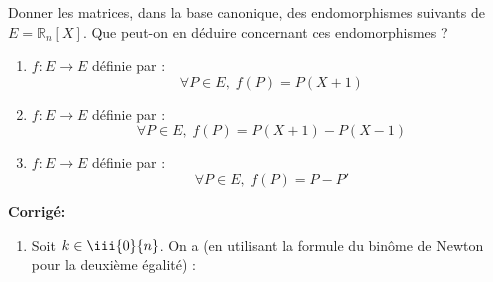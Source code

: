 \documentclass[a4paper,twoside,french,11pt]{VcCours}
\newcommand{\corr}{\textbf{Corrigé:}}
\begin{document}
\begin{Exercice}{} Donner les matrices, dans la base canonique, des endomorphismes suivants de $E=\mathbb{R}_n[X]$. Que peut-on en déduire concernant ces endomorphismes ?

\begin{enumerate}
\item $f : E \rightarrow E$ définie par :
$$ \forall P \in E, \; f(P) = P(X+1) $$
\item $f : E \rightarrow E$ définie par :
$$ \forall P \in E, \; f(P) = P(X+1)-P(X-1) $$
\item $f : E \rightarrow E$ définie par :
$$ \forall P \in E, \; f(P) = P-P' $$
\end{enumerate}
\end{Exercice} 

\corr \begin{enumerate}
\item Soit $k \in \iii{0}{n}$. On a (en utilisant la formule du binôme de Newton pour la deuxième égalité) : 


\end{enumerate}
\end{document}

